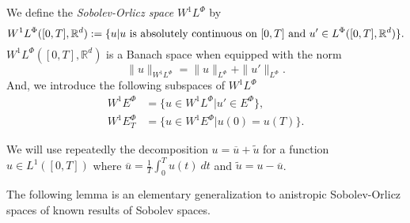 \documentclass[twoside]{article}
\theoremstyle{remark}
\newcommand{\orlnor}{\|_{L^{\Phi}}}
\newcommand{\lphi}{L^{\Phi}}
\newcommand{\ephi}{E^{\Phi}}
\newcommand{\wphi}{W^{1}\lphi}
\newcommand{\wphie}{W^{1}\ephi}
\newcommand{\rr}{\mathbb{R}}
\renewcommand{\leq}{\leqslant}
\newcounter{example}
\begin{document}
We define the \emph{Sobolev-Orlicz space} $\wphi$ by
\[\wphi([0,T],\rr^d):=\{u| u \hbox{ is absolutely continuous on $[0,T]$ and } u'\in \lphi([0,T],\rr^d)\}.\]
$\wphi([0,T],\rr^d)$ is a Banach space when equipped with the norm
\begin{equation}\label{def-norma-orlicz-sob}
\|  u  \|_{\wphi}= \|  u  \|_{\lphi} + \|u'\orlnor.
\end{equation}
And, we introduce the following subspaces of $\wphi$
\begin{equation}\label{def-esp-orlicz-sob-per}
\begin{split}
\wphie&=\{u\in\wphi|u'\in\ephi\},\\
\wphie_T&=\{u\in\wphie|u(0)=u(T)\}.
\end{split}
\end{equation}

%
%
 We will use repeatedly the decomposition $u=\overline{u}+\widetilde{u}$ for a function $u\in L^1([0,T])$  where $\overline{u} =\frac1T\int_0^T u(t)\ dt$ and $\widetilde{u}=u-\overline{u}$.

 The following lemma is an elementary generalization to anistropic Sobolev-Orlicz spaces of known results of Sobolev spaces.


%
%
%
%
%
%
%
%
%
%
\end{document}

